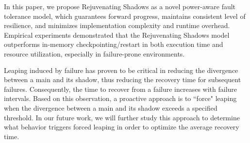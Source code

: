 
In this paper, we propose Rejuvenating Shadows as a novel power-aware fault tolerance model, which guarantees forward progress, maintains consistent level of resilience, and minimizes implementation complexity and runtime overhead. Empirical experiments demonstrated that the Rejuvenating Shadows model outperforms in-memory checkpointing/restart in both execution time and resource utilization, especially in failure-prone environments.

Leaping induced by failure has proven to be critical in reducing the divergence between a main and its shadow, 
thus reducing the recovery time for subsequent failures. Consequently, the time to recover from a failure increases with failure intervals.  
Based on this observation, a proactive approach is to ``force" leaping when the divergence between a main and its shadow exceeds a specified threshold. 
In our future work, we will further study this approach to determine what behavior triggers forced leaping in order to optimize the average recovery time. 





